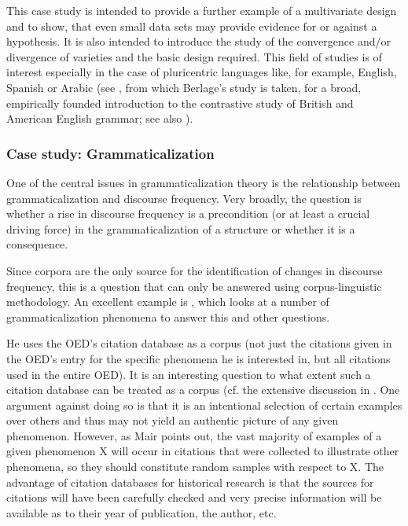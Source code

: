 This case study is intended to provide a further example of a multivariate design and to show, that even small data sets may provide evidence for or against a hypothesis. It is also intended to introduce the study of the convergence and/or divergence of varieties and the basic design required. This field of studies is of interest especially in the case of pluricentric languages like, for example, English, Spanish or Arabic (see \citet{rohdenburg_one_2009}, from which Berlage's study is taken, for a broad, empirically founded introduction to the contrastive study of British and American English grammar; see also \citet{leech_recent_2006}).

\subsubsection{Case study: Grammaticalization}
\label{sec:grammaticalization}

One of the central issues in grammaticalization theory is the relationship between grammaticalization and discourse frequency. Very broadly, the question is whether a rise in discourse frequency is a precondition (or at least a crucial driving force) in the grammaticalization of a structure or whether it is a consequence.

Since corpora are the only source for the identification of changes in discourse frequency, this is a question that can only be answered using corpus-linguistic methodology. An excellent example is \citet{lindquist_corpus_2004-1}, which looks at a number of grammaticalization phenomena to answer this and other questions.

He uses the OED's citation database as a corpus (not just the citations given in the OED's entry for the specific phenomena he is interested in, but all citations used in the entire OED). It is an interesting question to what extent such a citation database can be treated as a corpus (cf. the extensive discussion in \citet{hoffmann_using_2004}. One argument against doing so is that it is an intentional selection of certain examples over others and thus may not yield an authentic picture of any given phenomenon. However, as Mair points out, the vast majority of examples of a given phenomenon X will occur in citations that were collected to illustrate other phenomena, so they should constitute random samples with respect to X. The advantage of citation databases for historical research is that the sources for citations will have been carefully checked and very precise information will be available as to their year of publication, the author, etc.


